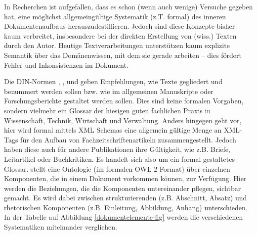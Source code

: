  
In Recherchen ist aufgefallen, dass es schon (wenn auch wenige) Versuche gegeben hat, eine möglichst allgemeingültige Systematik (z.T. formal) des inneren Dokumentenaufbaus herauszudestillieren. Jedoch sind diese Konzepte bisher kaum verbreitet, insbesondere bei der direkten Erstellung von (wiss.) Texten durch den Autor. Heutige Textverarbeitungen unterstützen kaum explizite Semantik über das Domänenwissen, mit dem sie gerade arbeiten -- dies fördert Fehler und Inkonsistenzen im Dokument.

 
Die DIN-Normen \citep{DIN1421}, \citep{DIN1422-1}, \citep{DIN1422-3} und \citep{DIN1422-4} geben Empfehlungen, wie Texte gegliedert und benummert werden sollen bzw. wie im allgemeinen Manuskripte oder Forschungsberichte gestaltet werden sollen. Dies sind keine formalen Vorgaben, sondern vielmehr ein Glossar der hiesigen guten fachlichen Praxis in Wissenschaft, Technik, Wirtschaft und Verwaltung. Anders hingegen geht \citep{NISO} vor, hier wird formal mittels XML Schemas eine allgemein gültige Menge an XML-Tags für den Aufbau von Fachzeitschriftenartikeln zusammengestellt. Jedoch haben diese auch für andere Publikationen ihre Gültigkeit, wie z.B. Briefe, Leitartikel oder Buchkritiken. Es handelt sich also um ein formal gestaltetes Glossar. \citep{Peroni} stellt eine Ontologie (im formalen OWL 2 Format) über einzelnen Komponenten, die in einem Dokument vorkommen können, zur Verfügung. Hier werden die Beziehungen, die die Komponenten untereinander pflegen, sichtbar gemacht. Es wird dabei zwischen strukturierenden (z.B. Abschnitt, Absatz) und rhetorischen Komponenten (z.B. Einleitung, Abbildung, Anhang) unterschieden. In der Tabelle auf Abbildung \ref{dokumentelemente-fig} werden die verschiedenen Systematiken miteinander verglichen.

